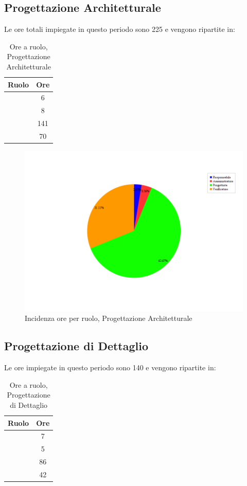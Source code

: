 \subsection{Progettazione Architetturale}
Le ore totali impiegate in questo periodo sono 225 e vengono ripartite in:
\begin{table}[H]
	\begin{center}
		\begin{tabular}{|c|c|}
			\hline
			\textbf{Ruolo}	& \textbf{Ore} \\
			\hline
			\Res	&	6	\\
			\hline
			\Amm	&	8	\\
			\hline
			\Prog		&	141	\\
			\hline
			\Ver	&	70	\\
			\hline
		\end{tabular}
	\end{center}
	\caption{Ore a ruolo, Progettazione Architetturale}
\end{table}

\begin{figure}[ht]
	\centering
	\includegraphics[scale=0.65]{immagini/Grafi/OreRuoloPA}
	\caption{Incidenza ore per ruolo, Progettazione Architetturale}
\end{figure} \FloatBarrier


\newpage
\subsection{Progettazione di Dettaglio}
Le ore impiegate in questo periodo sono 140 e vengono ripartite in:
\begin{table}[H]
	\begin{center}
		\begin{tabular}{|c|c|}
			\hline
			\textbf{Ruolo}	& \textbf{Ore} \\
			\hline
			\Res	&	7	\\
			\hline
			\Amm	&	5	\\
			\hline
			\Prog		&	86	\\
			\hline
			\Ver	&	42	\\
			\hline
		\end{tabular}
	\end{center}
	\caption{Ore a ruolo, Progettazione di Dettaglio}
\end{table}


